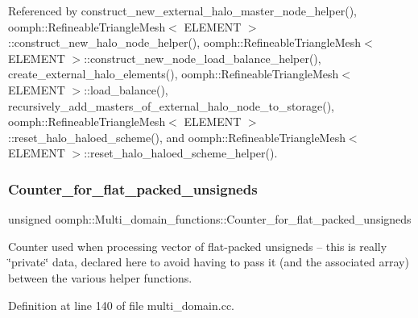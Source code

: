 Referenced by construct\+\_\+new\+\_\+external\+\_\+halo\+\_\+master\+\_\+node\+\_\+helper(), oomph\+::\+Refineable\+Triangle\+Mesh$<$ E\+L\+E\+M\+E\+N\+T $>$\+::construct\+\_\+new\+\_\+halo\+\_\+node\+\_\+helper(), oomph\+::\+Refineable\+Triangle\+Mesh$<$ E\+L\+E\+M\+E\+N\+T $>$\+::construct\+\_\+new\+\_\+node\+\_\+load\+\_\+balance\+\_\+helper(), create\+\_\+external\+\_\+halo\+\_\+elements(), oomph\+::\+Refineable\+Triangle\+Mesh$<$ E\+L\+E\+M\+E\+N\+T $>$\+::load\+\_\+balance(), recursively\+\_\+add\+\_\+masters\+\_\+of\+\_\+external\+\_\+halo\+\_\+node\+\_\+to\+\_\+storage(), oomph\+::\+Refineable\+Triangle\+Mesh$<$ E\+L\+E\+M\+E\+N\+T $>$\+::reset\+\_\+halo\+\_\+haloed\+\_\+scheme(), and oomph\+::\+Refineable\+Triangle\+Mesh$<$ E\+L\+E\+M\+E\+N\+T $>$\+::reset\+\_\+halo\+\_\+haloed\+\_\+scheme\+\_\+helper().

\mbox{\label{namespaceoomph_1_1Multi__domain__functions_a20f6de2e1bd15cb40c461d2ca3940bd7}} 
\subsubsection{\texorpdfstring{Counter\+\_\+for\+\_\+flat\+\_\+packed\+\_\+unsigneds}{Counter\_for\_flat\_packed\_unsigneds}}
{\footnotesize\ttfamily unsigned oomph\+::\+Multi\+\_\+domain\+\_\+functions\+::\+Counter\+\_\+for\+\_\+flat\+\_\+packed\+\_\+unsigneds}



Counter used when processing vector of flat-\/packed unsigneds -- this is really \char`\"{}private\char`\"{} data, declared here to avoid having to pass it (and the associated array) between the various helper functions. 



Definition at line 140 of file multi\+\_\+domain.\+cc.



